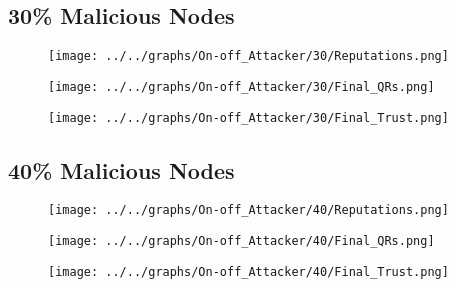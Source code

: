 \begin{minipage}[t]{0.49\columnwidth}
\subsection*{30\% Malicious Nodes}
    \begin{figure}[H]
        \centering
        \texttt{[image: ../../graphs/On-off\_Attacker/30/Reputations.png]}
    \end{figure}
    \begin{figure}[H]
        \centering
        \texttt{[image: ../../graphs/On-off\_Attacker/30/Final\_QRs.png]}
    \end{figure}
\end{minipage}
\begin{minipage}[t]{0.49\columnwidth}
    \begin{figure}[H]
        \centering
        \texttt{[image: ../../graphs/On-off\_Attacker/30/Final\_Trust.png]}
    \end{figure}
\end{minipage}

\begin{minipage}[t]{0.49\columnwidth}
\subsection*{40\% Malicious Nodes}
    \begin{figure}[H]
        \centering
        \texttt{[image: ../../graphs/On-off\_Attacker/40/Reputations.png]}
    \end{figure}
    \begin{figure}[H]
        \centering
        \texttt{[image: ../../graphs/On-off\_Attacker/40/Final\_QRs.png]}
    \end{figure}
\end{minipage}
\begin{minipage}[t]{0.49\columnwidth}
    \begin{figure}[H]
        \centering
        \texttt{[image: ../../graphs/On-off\_Attacker/40/Final\_Trust.png]}
    \end{figure}
\end{minipage}

